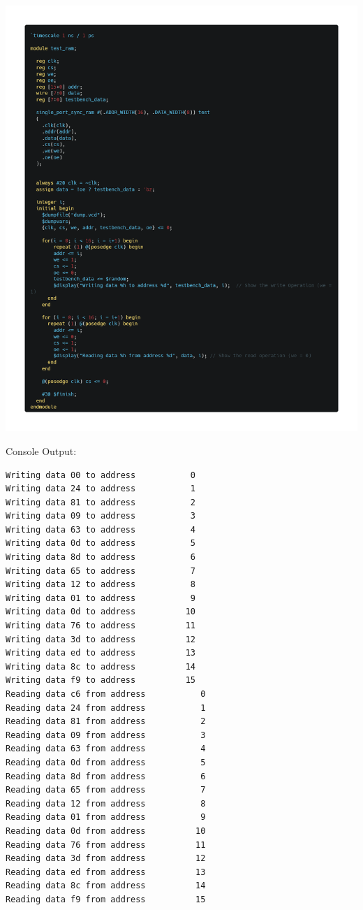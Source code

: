 \documentclass[12pt]{article}
\begin{document}
\begin{center}
    \includegraphics[scale=0.5]{images/ram_tb.png}
\end{center}
Console Output:
\begin{verbatim}
Writing data 00 to address           0
Writing data 24 to address           1
Writing data 81 to address           2
Writing data 09 to address           3
Writing data 63 to address           4
Writing data 0d to address           5
Writing data 8d to address           6
Writing data 65 to address           7
Writing data 12 to address           8
Writing data 01 to address           9
Writing data 0d to address          10
Writing data 76 to address          11
Writing data 3d to address          12
Writing data ed to address          13
Writing data 8c to address          14
Writing data f9 to address          15
Reading data c6 from address           0
Reading data 24 from address           1
Reading data 81 from address           2
Reading data 09 from address           3
Reading data 63 from address           4
Reading data 0d from address           5
Reading data 8d from address           6
Reading data 65 from address           7
Reading data 12 from address           8
Reading data 01 from address           9
Reading data 0d from address          10
Reading data 76 from address          11
Reading data 3d from address          12
Reading data ed from address          13
Reading data 8c from address          14
Reading data f9 from address          15
\end{verbatim}
\end{document}
